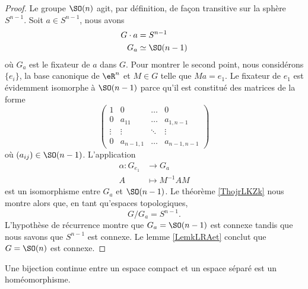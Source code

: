 \begin{proof}
    Le groupe \( \SO(n)\) agit, par définition, de façon transitive sur la sphère \( S^{n-1}\). Soit \( a\in S^{n-1}\), nous avons
    \begin{subequations}
        \begin{align}
            G\cdot a&=S^{n-1}\\
            G_a&\simeq \SO(n-1)
        \end{align}
    \end{subequations}
    où \( G_a\) est le fixateur de \( a\) dans \( G\). Pour montrer le second point, nous considérons \( \{ e_i \}\), la base canonique de \( \eR^n\) et \( M\in G\) telle que \( Ma=e_1\). Le fixateur de \( e_1\) est évidemment isomorphe à \( \SO(n-1)\) parce qu'il est constitué des matrices de la forme
    \begin{equation}
        \begin{pmatrix}
             1   &   0    &   \ldots    &   0    \\
             0   &   a_{11}    &   \ldots    &   a_{1,n-1}    \\
             \vdots   &   \vdots    &   \ddots    &   \vdots    \\ 
             0   &   a_{n-1,1}    &   \ldots    &   a_{n-1,n-1}     
         \end{pmatrix}
    \end{equation}
    où \( (a_{ij})\in \SO(n-1)\). L'application 
    \begin{equation}
        \begin{aligned}
            \alpha\colon G_{e_1} &\to G_{a} \\
            A&\mapsto M^{-1}A M
        \end{aligned}
    \end{equation}
    est un isomorphisme entre \( G_a\) et \( \SO(n-1)\). Le théorème \ref{ThojrLKZk} nous montre alors que, en tant qu'espaces topologiques,
    \begin{equation}
        G/G_a=S^{n-1}.
    \end{equation}
    L'hypothèse de récurrence montre que \( G_a=\SO(n-1)\) est connexe tandis que nous savons que \( S^{n-1}\) est connexe. Le lemme \ref{LemkLRAet} conclut que \( G=\SO(n)\) est connexe.
\end{proof}

\begin{lemma}       \label{LemIbrsFT}
    Une bijection continue entre un espace compact et un espace séparé est un homéomorphisme.
\end{lemma}

